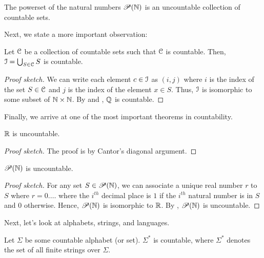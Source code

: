 \documentclass[11pt,usenames, dvipsnames]{article}
\DeclareRobustCommand{\euscr}[1]{%
  \text{\usefont{U}{eus}{m}{n}#1}%
}
\begin{document}
\begin{example}
  The powerset of the natural numbers $\mathscr{P}(\mathbb{N})$ is an uncountable collection of countable sets.
\end{example}

Next, we state a more important observation:

\begin{theorem}
  Let $\conn$ be a collection of countable sets such that $\conn$ is countable. Then, $\euscr{I} = \bigcup_{S \in \conn}{S}$ is countable.
\end{theorem}

\begin{proof}[Proof sketch]
  We can write each element $c \in \euscr{I}$ as $(i, j)$ where $i$ is the index of the set $S \in \conn$ and $j$ is the index of the element $x \in S$. Thus, $\euscr{I}$ is isomorphic to some subset of $\mathbb{N} \times \mathbb{N}$. By  and , $\mathbb{Q}$ is countable.
\end{proof}

Finally, we arrive at one of the most important theorems in countability.

\begin{theorem}
  $\mathbb{R}$ is uncountable.
\end{theorem}

\begin{proof}[Proof sketch]
  The proof is by Cantor's diagonal argument.
\end{proof}

\begin{theorem}
  $\mathscr{P}(\mathbb{N})$ is uncountable.
\end{theorem}

\begin{proof}[Proof sketch]
  For any set $S \in \mathscr{P}(\mathbb{N})$, we can associate a unique real number $r$ to $S$ where $r = 0.\ldots$ where the $i^{th}$ decimal place is $1$ if the $i^{th}$ natural number is in $S$ and $0$ otherwise. Hence, $\mathscr{P}(\mathbb{N})$ is isomorphic to $\mathbb{R}$. By , $\mathscr{P}(\mathbb{N})$ is uncountable.
\end{proof}

Next, let's look at alphabets, strings, and languages.

\begin{theorem}
  Let $\Sigma$ be some countable alphabet (or set). $\Sigma^*$ is countable, where $\Sigma^*$ denotes the set of all finite strings over $\Sigma$.
\end{theorem}
\end{document}
